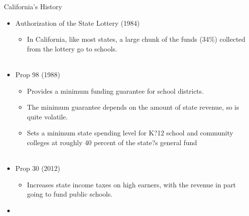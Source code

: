 \documentclass[handout]{beamer}
\begin{document}
\begin{frame}{California's History}
	\begin{itemize}
		\item Authorization of the State Lottery (1984)
		\begin{itemize}
			\item In California, like most states, a large chunk of the funds (34\%) collected from the lottery go to schools. \\~\\
		\end{itemize} 
		\item Prop 98 (1988)
		\begin{itemize}
			\item Provides a minimum funding guarantee for school districts. 
			\item The minimum guarantee depends on the amount of state revenue, so is quite volatile.
			\item Sets a minimum state spending level for K?12 school and community colleges at roughly 40 percent of the state?s general fund\\~\\
		\end{itemize}
		\item Prop 30 (2012)
		\begin{itemize}
			\item Increases state income taxes on high earners, with the revenue in part going to fund public schools.
		\end{itemize}
		\item \href{https://www.ppic.org/publication/school-finance/}{}
	\end{itemize}
\end{frame}
\end{document}
